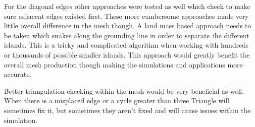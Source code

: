 For the diagonal edges other approaches were tested as well which check to make sure adjacent edges existed first.  These more cumbersome approaches made very little overall difference in the mesh though.  A land mass based approach needs to be taken which snakes along the grounding line in order to separate the different islands.  This is a tricky and complicated algorithm when working with hundreds or thousands of possible smaller islands.  This approach would greatly benefit the overall mesh production though making the simulations and applications more accurate.

Better triangulation checking within the mesh would be very beneficial as well.  When there is a misplaced edge or a cycle greater than three Triangle will sometimes fix it, but sometimes they aren't fixed and will cause issues within the simulation.

